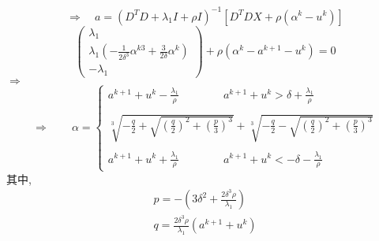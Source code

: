 \documentclass[245.0pt]{article}
\begin{document}
\begin{equation*}
\Rightarrow \quad a = ( D^{T} D + \lambda_{1} I + \rho I )^{-1} [ D^{T}DX + \rho ( \alpha^{k} - u^{k} ) ]
\end{equation*}
\begin{equation*}
\begin{pmatrix}
\lambda_{1} \\
\lambda_{1} (- \frac{1}{2 \delta^{3}} \alpha^{k 3} + \frac{3}{2 \delta} \alpha^{k} )\\
-\lambda_{1}
\end{pmatrix}
+ \rho(\alpha^k - a^{k+1} - u^{k}) = 0 \tag{3.18}
\end{equation*}
$\Rightarrow $
\begin{equation*}
\Rightarrow \qquad \alpha = 
\begin{cases}
a^{k+1}+u^{k}-\frac{\lambda_{1}}{\rho} \qquad \qquad a^{k+1} + u^{k}>\delta + \frac{\lambda_{1}}{\rho} \\
\\
\sqrt[3]{ - \frac{q}{2} + \sqrt{ ( \frac{q}{2} )^{2} + (\frac{p}{3} )^{3} } } + \sqrt[3]{ - \frac{q}{2} - \sqrt{ (\frac{q}{2} )^{2} + (\frac{p}{3} )^{3} } } \\
\\
a^{k+1} + u^{k} + \frac{\lambda_{1}}{\rho} \qquad \qquad a^{k+1} 
+ u^{k} < -\delta - \frac{\lambda_{1}}{\rho}
\end{cases} \tag{3.19}
\end{equation*}
%
其中,
\begin{equation*}
\begin{split}
p = - ( 3 \delta^{2} + \frac{2 \delta^{3} \rho}{\lambda_{1} } ) \\
q = \frac{2\delta^{3} \rho}{\lambda_{1}} (a^{k+1} + u^{k} )
\end{split}
\end{equation*}
\end{document}
